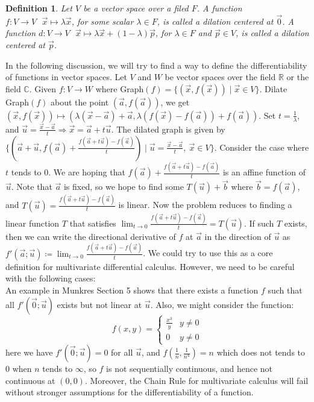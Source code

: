 \documentclass[11pt,oneside]{book}
\theoremstyle{break}
\theoremstyle{break}
\newtheorem{defn}{Definition}[corL]
\newcommand{\R}{\mathbb{R}}
\newcommand{\Complex}{\mathbb{C}}
\begin{document}
\begin{defn}
Let $V$ be a vector space over a filed $F$. A function $f:V \to V \ \ \ \vec{x}\mapsto \lambda \vec{x}$, for some scalar $\lambda \in F$, is called a dilation centered at $\vec{0}$. A function $d:V \to V \ \ \ \vec{x}\mapsto \lambda \vec{x} + (1-\lambda)\vec{p}$, for $\lambda \in F$ and $\vec{p}\in V$, is called a dilation centered at $\vec{p}$.\\
\end{defn}

In the following discussion, we will try to find a way to define the differentiability of functions in vector spaces. Let $V$ and $W$ be vector spaces over the field $\R$ or the field $\Complex$. Given $f:V \to W$ where Graph$(f) = \{ (\vec{x},f(\vec{x})) \mid \vec{x}\in V\}$. Dilate Graph$(f)$ about the point $(\vec{a},f(\vec{a}))$, we get $(\vec{x},f(\vec{x}))\mapsto (\lambda (\vec{x}-\vec{a})+\vec{a},\lambda (f(\vec{x})-f(\vec{a}))+f(\vec{a}))$. Set $t = \frac{1}{\lambda}$, and $\vec{u} = \frac{\vec{x}-\vec{a}}{t}\Rightarrow \vec{x} = \vec{a}+t \vec{u}$. The dilated graph is given by $\{(\vec{a}+\vec{u},f(\vec{a})+\frac{f(\vec{a}+t\vec{u})-f(\vec{a})}{t})\mid \vec{u} = \frac{\vec{x}-\vec{a}}{t},\ \vec{x}\in V\}$. Consider the case where $t$ tends to $0$. We are hoping that $f(\vec{a})+\frac{f(\vec{a}+t\vec{u})-f(\vec{a})}{t}$ is an affine function of $\vec{u}$. Note that $\vec{a}$ is fixed, so we hope to find some $T(\vec{u})+\vec{b}$ where $\vec{b} = f(\vec{a})$, and $T(\vec{u}) = \frac{f(\vec{a}+t\vec{u})-f(\vec{a})}{t}$ is linear. Now the problem reduces to finding a linear function $T$ that satisfies $\lim_{t\to 0} \frac{f(\vec{a}+t\vec{u})-f(\vec{a})}{t} = T(\vec{u})$. If such $T$ exists, then we can write the directional derivative of $f$ at $\vec{a}$ in the direction of $\vec{u}$ as $f'(\vec{a};\vec{u}) \coloneqq \lim_{t\to 0} \frac{f(\vec{a}+t\vec{u})-f(\vec{a})}{t}$. We could try to use this as a core definition for multivariate differential calculus. However, we need to be careful with the following cases:\\

An example in Munkres Section 5 shows that there exists a function $f$ such that all $f'(\vec{0};\vec{u})$ exists but not linear at $\vec{u}$. Also, we might consider the function: $$f(x,y) = \begin{cases} \frac{x^3}{y} & y\neq 0 \\ 0 & y \neq 0\end{cases}$$ here we have $f'(\vec{0};\vec{u}) = 0$ for all $\vec{u}$, and $f(\frac{1}{n},\frac{1}{n^4}) = n$ which does not tends to $0$ when $n$ tends to $\infty$, so $f$ is not sequentially continuous, and hence not continuous at $(0,0)$. Moreover, the Chain Rule for multivariate calculus will fail without stronger assumptions for the differentiability of a function.\\
\end{document}
